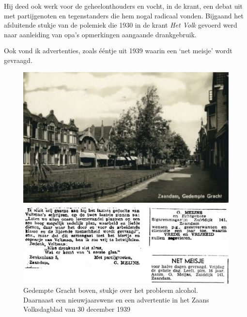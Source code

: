 \documentclass[10pt,twoside, openright]{memoir}
\begin{document}

Hij deed ook werk voor de geheelonthouders en vocht, in de krant, een debat uit met partijgenoten en tegenstanders die hem nogal radicaal vonden. Bijgaand het afsluitende stukje van de polemiek die 1930 in de krant \emph{Het Volk} gevoerd werd naar aanleiding van opa’s opmerkingen aangaande drankgebruik.

Ook vond ik advertenties, zoals ééntje uit 1939 waarin een `net meisje' wordt gevraagd.

\begin{figure}
\includegraphics[width=\textwidth]{img/ch2/collectie}
\caption*{\footnotesize Gedempte Gracht boven, stukje over het probleem alcohol. Daarnaast een nieuwjaarswens en een advertentie in het Zaans Volksdagblad van 30 december 1939}
\end{figure}
\end{document}
